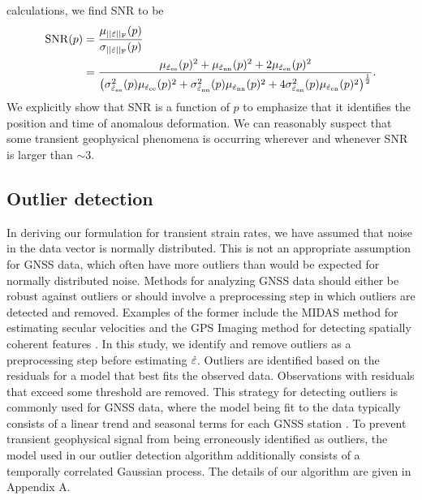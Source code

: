 \documentclass[extra,mreferee]{gji}
\begin{document}
calculations, we find SNR to be
\begin{align}\label{eq:SNR}
\mathrm{SNR}(p) &= \frac{\mu_{||\dot\varepsilon||_\mathrm{F}}(p)}{\sigma_{||\dot\varepsilon||_\mathrm{F}}(p)} \\
                &= \frac{\mu_{\dot\varepsilon_{\mathrm{e}\mathrm{e}}}(p)^2 +
                         \mu_{\dot\varepsilon_{\mathrm{n}\mathrm{n}}}(p)^2 +
                         2\mu_{\dot\varepsilon_{\mathrm{e}\mathrm{n}}}(p)^2}
                        {\big(\sigma^2_{\dot\varepsilon_{\mathrm{e}\mathrm{e}}}(p)\mu_{\dot\varepsilon_{\mathrm{e}\mathrm{e}}}(p)^2 + 
                              \sigma^2_{\dot\varepsilon_{\mathrm{n}\mathrm{n}}}(p)\mu_{\dot\varepsilon_{\mathrm{n}\mathrm{n}}}(p)^2 + 
                              4\sigma^2_{\dot\varepsilon_{\mathrm{e}\mathrm{n}}}(p)\mu_{\dot\varepsilon_{\mathrm{e}\mathrm{n}}}(p)^2
                         \big)^{\frac{1}{2}}}.
\end{align}
We explicitly show that SNR is a function of $p$ to emphasize that it
identifies the position and time of anomalous deformation. We can
reasonably suspect that some transient geophysical phenomena is
occurring wherever and whenever SNR is larger than ${\sim}3$.

\subsection{Outlier detection}\label{sec:Outlier}


In deriving our formulation for transient strain rates, we have
assumed that noise in the data vector is normally distributed. This is
not an appropriate assumption for GNSS data, which often have more
outliers than would be expected for normally distributed noise.
Methods for analyzing GNSS data should either be robust against
outliers or should involve a preprocessing step in which outliers are
detected and removed. Examples of the former include the MIDAS method
for estimating secular velocities \citep{Blewitt2016} and the GPS
Imaging method for detecting spatially coherent features
\citep{Hammond2016}. In this study, we identify and remove outliers as
a preprocessing step before estimating $\dot\varepsilon$. Outliers are
identified based on the residuals for a model that best fits the
observed data. Observations with residuals that exceed some threshold
are removed. This strategy for detecting outliers is commonly used for
GNSS data, where the model being fit to the data typically consists of
a linear trend and seasonal terms for each GNSS station
\citep[e.g.,][]{Johansson2002,Dong2006,Bos2013}. To prevent transient
geophysical signal from being erroneously identified as outliers, the
model used in our outlier detection algorithm additionally consists of
a temporally correlated Gaussian process. The details of our algorithm
are given in Appendix A.
\end{document}

